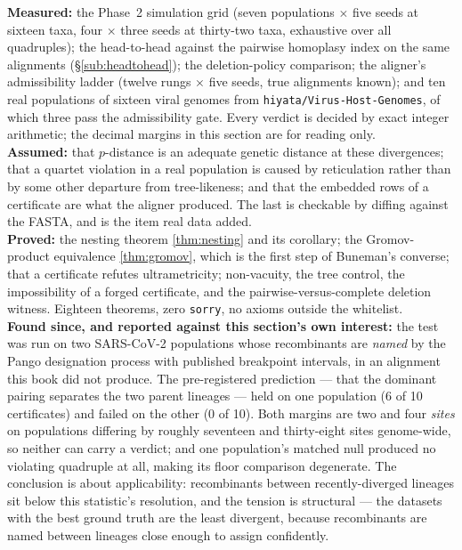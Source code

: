 \begin{ledger}
\textbf{Measured:} the Phase~2 simulation grid (seven populations $\times$ five
seeds at sixteen taxa, four $\times$ three seeds at thirty-two taxa, exhaustive
over all quadruples); the head-to-head against the pairwise homoplasy index on
the same alignments (\S\ref{sub:headtohead}); the deletion-policy comparison; the aligner's
admissibility ladder (twelve rungs $\times$ five seeds, true alignments known);
and ten real populations of sixteen viral genomes from
\texttt{hiyata/Virus-Host-Genomes}, of which three pass the admissibility gate.
Every verdict is decided by exact integer arithmetic; the decimal margins in
this section are for reading only. \\
\textbf{Assumed:} that $p$-distance is an adequate genetic distance at these
divergences; that a quartet violation in a real population is caused by
reticulation rather than by some other departure from tree-likeness; and that
the embedded rows of a certificate are what the aligner produced. The last is
checkable by diffing against the FASTA, and is the item real data added. \\
\textbf{Proved:} the nesting theorem \eqref{thm:nesting} and its corollary; the
Gromov-product equivalence \eqref{thm:gromov}, which is the first step of
Buneman's converse; that a certificate refutes ultrametricity; non-vacuity, the
tree control, the impossibility of a forged certificate, and the
pairwise-versus-complete deletion witness. Eighteen theorems, zero
\texttt{sorry}, no axioms outside the whitelist. \\
\textbf{Found since, and reported against this section's own interest:} the test
was run on two SARS-CoV-2 populations whose recombinants are \emph{named} by the
Pango designation process with published breakpoint intervals, in an alignment
this book did not produce. The pre-registered prediction --- that the dominant
pairing separates the two parent lineages --- held on one population (6 of 10
certificates) and failed on the other (0 of 10). Both margins are two and four
\emph{sites} on populations differing by roughly seventeen and thirty-eight sites
genome-wide, so neither can carry a verdict; and one population's matched null
produced no violating quadruple at all, making its floor comparison degenerate.
The conclusion is about applicability: recombinants between recently-diverged
lineages sit below this statistic's resolution, and the tension is structural ---
the datasets with the best ground truth are the least divergent, because
recombinants are named between lineages close enough to assign confidently.


\end{ledger}
